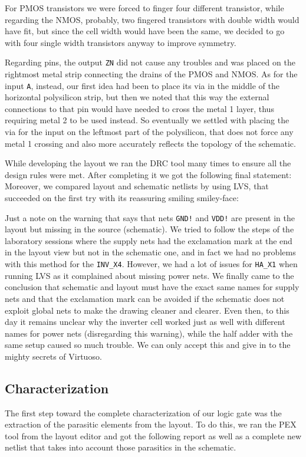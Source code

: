 \documentclass[a4paper]{article}
\newcommand{\inv}{\texttt{INV\_X4}\xspace}
\newcommand{\ha}{\texttt{HA\_X1}\xspace}
\begin{document}
For PMOS transistors we were forced to finger four different transistor, while regarding the NMOS, probably, two fingered transistors with double width would have fit, but since the cell width would have been the same, we decided to go with four single width transistors anyway to improve symmetry.

Regarding pins, the output \texttt{ZN} did not cause any troubles and was placed on the rightmost metal strip connecting the drains of the PMOS and NMOS. As for the input \texttt{A}, instead, our first idea had been to place its via in the middle of the horizontal polysilicon strip, but then we noted that this way the external connections to that pin would have needed to cross the metal 1 layer, thus requiring metal 2 to be used instead. So eventually we settled with placing the via for the input on the leftmost part of the polysilicon, that does not force any metal 1 crossing and also more accurately reflects the topology of the schematic.

While developing the layout we ran the DRC tool many times to ensure all the design rules were met. After completing it we got the following final statement:
\newpage
{}
\newpage
Moreover, we compared layout and schematic netlists by using LVS, that succeeded on the first try with its reassuring smiling smiley-face:

Just a note on the warning that says that nets \texttt{GND!} and \texttt{VDD!} are present in the layout but missing in the source (schematic). We tried to follow the steps of the laboratory sessions where the supply nets had the exclamation mark at the end in the layout view but not in the schematic one, and in fact we had no problems with this method for the \inv. However, we had a lot of issues for \ha when running LVS as it complained about missing power nets. We finally came to the conclusion that schematic and layout must have the exact same names for supply nets and that the exclamation mark can be avoided if the schematic does not exploit global nets to make the drawing cleaner and clearer. Even then, to this day it remains unclear why the inverter cell worked just as well with different names for power nets (disregarding this warning), while the half adder with the same setup caused so much trouble. We can only accept this and give in to the mighty secrets of Virtuoso.


\subsection{Characterization}
\label{sec: inv_char}
The first step toward the complete characterization of our logic gate was the extraction of the parasitic elements from the layout. To do this, we ran the PEX tool from the layout editor and got the following report as well as a complete new netlist that takes into account those parasitics in the schematic.
\end{document}
